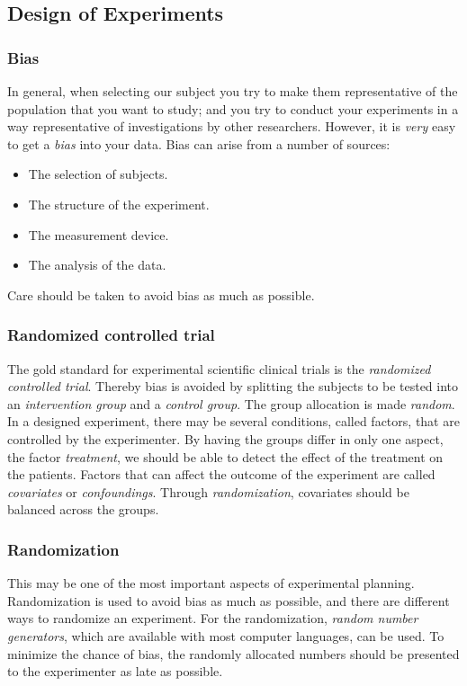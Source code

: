 \subsection{Design of Experiments}

\subsubsection{Bias} 
In general, when selecting our subject you try to make them representative of the population that you want to study; and you try to conduct your experiments in a way representative of investigations by other researchers. However, it is \emph{very} easy to get a \emph{bias} into your data. Bias can arise from a number of sources:
\begin{itemize}
  \item The selection of subjects.
  \item The structure of the experiment.
  \item The measurement device.
  \item The analysis of the data.
\end{itemize}
Care should be taken to avoid bias as much as possible.

\subsubsection{Randomized controlled trial} 
The gold standard for experimental scientific clinical trials is the \emph{randomized controlled trial}. Thereby bias is avoided by splitting the subjects to be tested into an \emph{intervention group} and a \emph{control group}. The group allocation is made \emph{random}.
In a designed experiment, there may be several conditions, called factors, that are controlled by the experimenter. By having the groups differ in only one aspect, the factor \emph{treatment}, we should be able to detect the effect of the treatment on the patients.
Factors that can affect the outcome of the experiment are called \emph{covariates} or \emph{confoundings}. Through \emph{randomization}, covariates should be balanced across the groups.

\subsubsection{Randomization} 
This may be one of the most important aspects of experimental planning. Randomization is used to avoid bias as much as possible, and there are different ways to randomize an experiment. For the randomization, \emph{random number generators}, which are available with most computer languages, can be used. To minimize the chance of bias, the randomly allocated numbers should be presented to the experimenter as late as possible.

